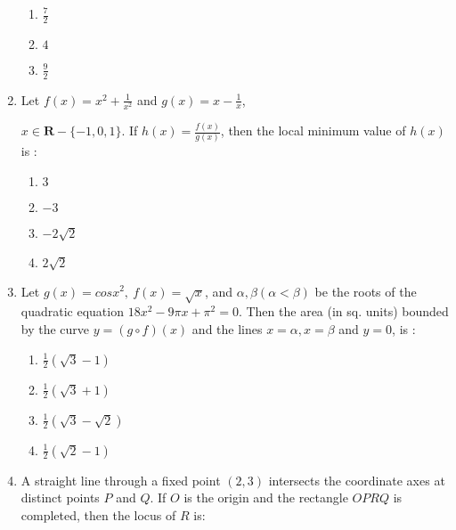 \documentclass[journal,12pt,twocolumn]{IEEEtran}
\begin{document}
\begin{enumerate}[1.]
\begin{enumerate}[(1)]
\item $
\frac{7}{2}
$

\item $
4
$

\item $
\frac{9}{2}
$


\end{enumerate}


\item Let $f(x)=x^2+\frac{1}{x^2}$ and $g(x)=x-\frac{1}{x}$,

$ x \in \textbf{R}-\lbrace -1,0,1 \rbrace $. If $h(x)=\frac{f(x)}{g(x)}$, then the local minimum value of $h(x)$ is :

\begin{enumerate}[(1)]
 
\item $
3
$

\item $
-3
$

\item $
-2\sqrt{2}
$

\item $
2\sqrt{2}
$


\end{enumerate}


\item Let $g(x)=cos x^2, \ f(x)=\sqrt{x} $, and $\alpha,\beta (\alpha < \beta)$ be the roots of the quadratic equation $18x^2-9\pi x+{\pi}^2=0$. Then the area (in sq. units) bounded by the curve $y=(g\circ f)(x)$ and the lines $x=\alpha , x=\beta$ and $y=0$, is :

\begin{enumerate}[(1)]
 
\item $
\frac{1}{2}(\sqrt{3}-1)
$

\item $
\frac{1}{2}(\sqrt{3}+1)
$

\item $
\frac{1}{2}(\sqrt{3}-\sqrt{2})
$

\item $
\frac{1}{2}(\sqrt{2}-1)
$


\end{enumerate}

\item A straight line through a fixed point $(2,3)$ intersects the coordinate axes at distinct points $P$ 
and $Q$. If $O$ is the origin and the rectangle $OPRQ$ is completed, then the locus of $R$ is:

\begin{enumerate}[(1)]
 

\end{enumerate}
\end{enumerate}
\end{document}
